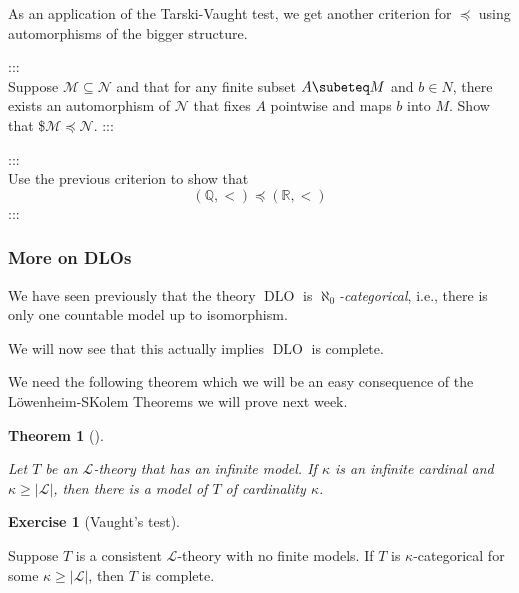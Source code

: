 \documentclass[
]{article}
\theoremstyle{definition}
\newtheorem{exercise}{Exercise}[section]
\theoremstyle{plain}
\newtheorem{theorem}{Theorem}[section]
\theoremstyle{remark}
\begin{document}
As an application of the Tarski-Vaught test, we get another criterion
for \(\preceq\) using automorphisms of the bigger structure.

:::\\
Suppose \(\mathcal{M} \subseteq \mathcal{N}\) and that for any finite
subset \(A \subeteq M\) and \(b \in N\), there exists an automorphism of
\(\mathcal{N}\) that fixes \(A\) pointwise and maps \(b\) into \(M\).
Show that \$\(\mathcal{M} \preceq \mathcal{N}\). :::

:::\\
Use the previous criterion to show that \[
(\mathbb{Q}, <) \preceq (\mathbb{R}, <)
\] :::

\subsubsection{More on DLOs}\label{more-on-dlos}

We have seen previously that the theory \(\operatorname{DLO}\) is
\emph{\(\aleph_0\)-categorical}, i.e., there is only one countable model
up to isomorphism.

We will now see that this actually implies \(\operatorname{DLO}\) is
complete.

We need the following theorem which we will be an easy consequence of
the Löwenheim-SKolem Theorems we will prove next week.

\begin{theorem}[]\protect\hypertarget{thm-}{}\label{thm-}

Let \(T\) be an \(\mathcal{L}\)-theory that has an infinite model. If
\(\kappa\) is an infinite cardinal and \(\kappa \geq |\mathcal{L}|\),
then there is a model of \(T\) of cardinality \(\kappa\).

\end{theorem}

\begin{exercise}[Vaught's test]\protect\hypertarget{exr-}{}\label{exr-}

Suppose \(T\) is a consistent \(\mathcal{L}\)-theory with no finite
models. If \(T\) is \(\kappa\)-categorical for some
\(\kappa \geq |\mathcal{L}|\), then \(T\) is complete.

\end{exercise}
\end{document}
